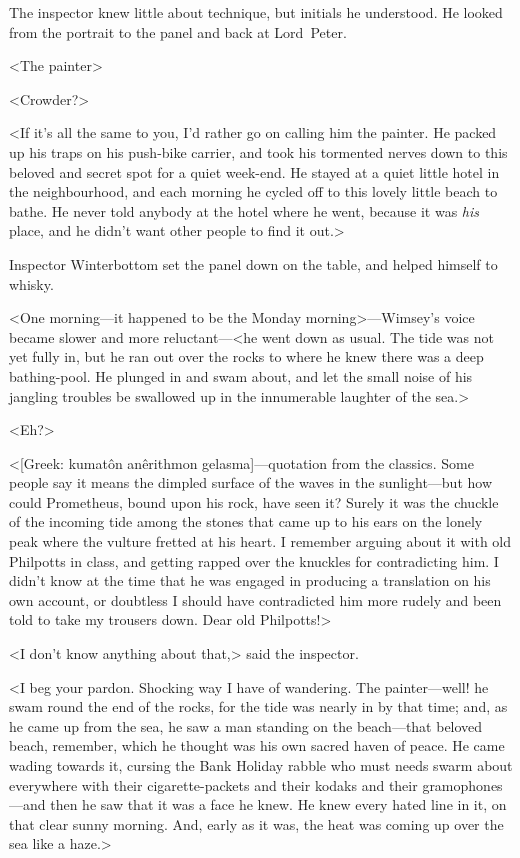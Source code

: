 The inspector knew little about technique, but initials he understood. He looked from the portrait to the panel and back at Lord~Peter.

<The painter\longdash>

<Crowder?>

<If it's all the same to you, I'd rather go on calling him the painter. He packed up his traps on his push-bike carrier, and took his tormented nerves down to this beloved and secret spot for a quiet week-end. He stayed at a quiet little hotel in the neighbourhood, and each morning he cycled off to this lovely little beach to bathe. He never told anybody at the hotel where he went, because it was \textit{his} place, and he didn't want other people to find it out.>

Inspector Winterbottom set the panel down on the table, and helped himself to whisky.

<One morning—it happened to be the Monday morning>—Wimsey's voice became slower and more reluctant—<he went down as usual. The tide was not yet fully in, but he ran out over the rocks to where he knew there was a deep bathing-pool. He plunged in and swam about, and let the small noise of his jangling troubles be swallowed up in the innumerable laughter of the sea.>

<Eh?>

<[Greek: kumatôn anêrithmon gelasma]—quotation from the classics. Some people say it means the dimpled surface of the waves in the sunlight—but how could Prometheus, bound upon his rock, have seen it? Surely it was the chuckle of the incoming tide among the stones that came up to his ears on the lonely peak where the vulture fretted at his heart. I remember arguing about it with old Philpotts in class, and getting rapped over the knuckles for contradicting him. I didn't know at the time that he was engaged in producing a translation on his own account, or doubtless I should have contradicted him more rudely and been told to take my trousers down. Dear old Philpotts!>

<I don't know anything about that,> said the inspector.

<I beg your pardon. Shocking way I have of wandering. The painter—well! he swam round the end of the rocks, for the tide was nearly in by that time; and, as he came up from the sea, he saw a man standing on the beach—that beloved beach, remember, which he thought was his own sacred haven of peace. He came wading towards it, cursing the Bank Holiday rabble who must needs swarm about everywhere with their cigarette-packets and their kodaks and their gramophones—and then he saw that it was a face he knew. He knew every hated line in it, on that clear sunny morning. And, early as it was, the heat was coming up over the sea like a haze.>

